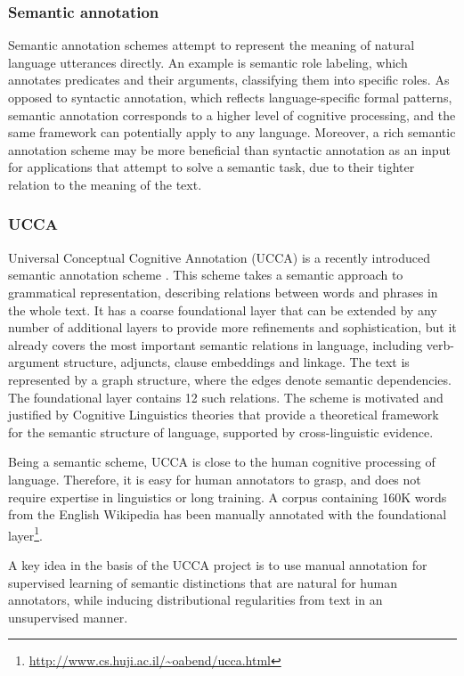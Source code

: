 \documentclass[11pt]{article}
\begin{document}
\subsubsection{Semantic annotation}

Semantic annotation schemes attempt to represent the meaning of natural language utterances directly. An example is semantic role labeling\cite{baker1998framenet}\cite{paass2014semantic}, which annotates predicates and their arguments, classifying them into specific roles. As opposed to syntactic annotation, which reflects language-specific formal patterns, semantic annotation corresponds to a higher level of cognitive processing, and the same framework can potentially apply to any language. Moreover, a rich semantic annotation scheme may be more beneficial than syntactic annotation as an input for applications that attempt to solve a semantic task, due to their tighter relation to the meaning of the text.


\subsubsection{UCCA}

Universal Conceptual Cognitive Annotation (UCCA) is a recently introduced semantic annotation scheme \cite{abend2013ucca}\cite{abend2013universal}. This scheme takes a semantic approach to grammatical representation, describing relations between words and phrases in the whole text. It has a coarse foundational layer that can be extended by any number of additional layers to provide more refinements and sophistication, but it already covers the most important semantic relations in language, including verb-argument structure, adjuncts, clause embeddings and linkage. The text is represented by a graph structure, where the edges denote semantic dependencies. The foundational layer contains 12 such relations. The scheme is motivated and justified by Cognitive Linguistics theories that provide a theoretical framework for the semantic structure of language, supported by cross-linguistic evidence.

Being a semantic scheme, UCCA is close to the human cognitive processing of language. Therefore, it is easy for human annotators to grasp, and does not require expertise in linguistics or long training. A corpus containing 160K words from the English Wikipedia has been manually annotated with the foundational layer\footnote{\url{http://www.cs.huji.ac.il/~oabend/ucca.html}}.

A key idea in the basis of the UCCA project is to use manual annotation for supervised learning of semantic distinctions that are natural for human annotators, while inducing distributional regularities from text in an unsupervised manner.
\end{document}
